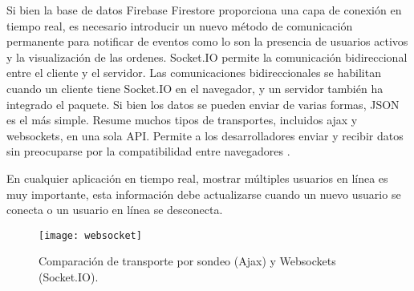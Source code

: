 Si bien la base de datos Firebase Firestore proporciona una capa de conexión en tiempo real, es necesario introducir un nuevo método de comunicación permanente para notificar de eventos como lo son la presencia de usuarios activos y la visualización de las ordenes. Socket.IO permite la comunicación bidireccional entre el cliente y el servidor. Las comunicaciones bidireccionales se habilitan cuando un cliente tiene Socket.IO en el navegador, y un servidor también ha integrado el paquete. Si bien los datos se pueden enviar de varias formas, JSON es el más simple. Resume muchos tipos de transportes, incluidos \acrshort{ajax}  y \Glspl{websocket}, en una sola API. Permite a los desarrolladores enviar y recibir datos sin preocuparse por la compatibilidad entre navegadores \cite{kelleher}.
\vspace{0.8cm}

En cualquier aplicación en tiempo real, mostrar múltiples usuarios en línea es muy importante, esta información debe actualizarse cuando un nuevo usuario se conecta o un usuario en línea se desconecta.
\vspace{0.8cm}

\begin{figure}[H]
  \centering
  \texttt{[image: websocket]}
  \caption{Comparación de transporte por sondeo (Ajax) y Websockets (Socket.IO).}
\end{figure}


